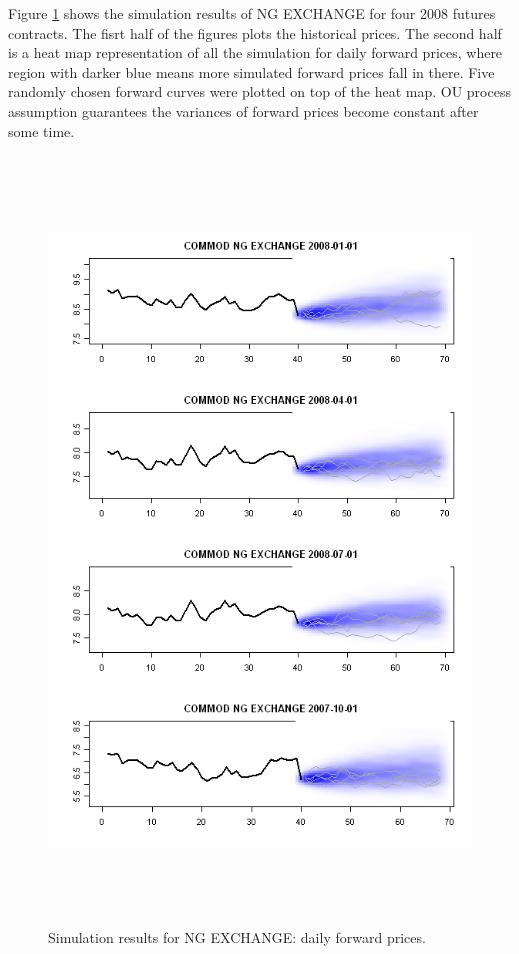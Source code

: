 Figure \ref{ng-allsim} shows the simulation results 
of NG EXCHANGE for four 2008 futures contracts. 
The fisrt half of the figures plots the historical prices.
The second half is a heat map representation
of all the simulation for daily forward prices, 
where region with darker blue means 
more simulated forward prices fall in there. Five 
randomly chosen forward curves were plotted on top of
the heat map. OU process assumption
guarantees the variances of forward prices become 
constant after some time. 
\begin{figure}[htbp]
\centering
\includegraphics[width=5.5in, height=8in]{figures/ng-exchange-allsim.png}
\caption{Simulation results for NG EXCHANGE: daily forward prices.}
\label{ng-allsim}
\end{figure}


